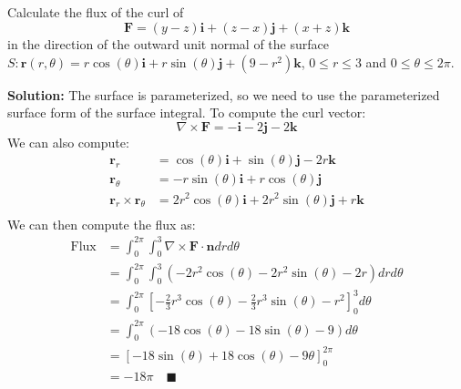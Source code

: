 \documentclass[letterpaper, 11pt]{article}
\begin{document}
\subsection{} Calculate the flux of the curl of 
\[ \bm{F} = (y-z)\bm{i} + (z - x)\bm{j} + (x + z) \bm{k} \]
in the direction of the outward unit normal of the surface $S : \bm{r}(r,\theta) = r \cos(\theta) \bm{i} + r \sin(\theta) \bm{j} + (9 - r^2) \bm{k}$, $ 0 \leq r \leq 3$ and $ 0 \leq \theta \leq 2 \pi$. 
\par \textbf{Solution:} The surface is parameterized, so we need to use the parameterized surface form of the surface integral. To compute the curl vector:
\[ \nabla \times \bm{F} = - \bm{i} -2 \bm{j} -2 \bm{k} \]
We can also compute:
\begin{align*}
\bm{r}_r &= \cos (\theta) \bm{i} + \sin (\theta) \bm{j} -2r \bm{k} \\
\bm{r}_\theta &= -r \sin(\theta) \bm{i} + r \cos (\theta) \bm{j} \\
\bm{r}_r \times \bm{r}_\theta &= 2r^2 \cos(\theta) \bm{i} + 2r^2 \sin(\theta) \bm{j} + r \bm{k} \\
\end{align*}
We can then compute the flux as:
\begin{align*}
\text{Flux} &= \int_0^{2 \pi} \int_0^3 \nabla \times \bm{F} \cdot \bm{n} dr d \theta \\
&= \int_0^{2 \pi} \int_0^3 (-2r^2 \cos(\theta) - 2 r^2 \sin(\theta) - 2r )dr d\theta \\
&= \int_0^{2 \pi} \left[-\frac{2}{3} r^3\cos(\theta) - \frac{2}{3} r^3 \sin(\theta) - r^2   \right]_0^3 d\theta \\
&= \int_0^{2\pi}(-18\cos(\theta) - 18\sin(\theta) - 9 ) d\theta \\
&= \left[-18\sin(\theta) + 18 \cos(\theta) - 9 \theta  \right]_0^{2\pi} \\
&= -18 \pi \quad\blacksquare 
\end{align*}
\end{document}
